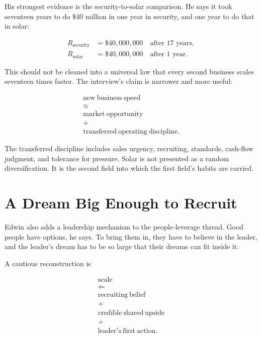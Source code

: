 \documentclass[11pt,oneside]{book}
\begin{document}
His strongest evidence is the security-to-solar comparison. He says it took seventeen years to do \(\$40\) million in one year in security, and one year to do that in solar:

\begin{align}
R_{\mathrm{security}} &= \$40{,}000{,}000
\quad \text{after }17\text{ years},\\
R_{\mathrm{solar}} &= \$40{,}000{,}000
\quad \text{after }1\text{ year}.
\end{align}

This should not be cleaned into a universal law that every second business scales seventeen times faster. The interview's claim is narrower and more useful:

\begin{equation}
\begin{gathered}
\mathrm{new\ business\ speed}\\
\approx\\
\mathrm{market\ opportunity}\\
+\\
\mathrm{transferred\ operating\ discipline}.
\end{gathered}
\end{equation}

The transferred discipline includes sales urgency, recruiting, standards, cash-flow judgment, and tolerance for pressure. Solar is not presented as a random diversification. It is the second field into which the first field's habits are carried.

\section{A Dream Big Enough to Recruit}

Edwin also adds a leadership mechanism to the people-leverage thread. Good people have options, he says. To bring them in, they have to believe in the leader, and the leader's dream has to be so large that their dreams can fit inside it.

A cautious reconstruction is

\begin{equation}
\begin{gathered}
\mathrm{scale}\\
\Longleftarrow\\
\mathrm{recruiting\ belief}\\
+\\
\mathrm{credible\ shared\ upside}\\
+\\
\mathrm{leader's\ first\ action}.
\end{gathered}
\end{equation}
\end{document}

